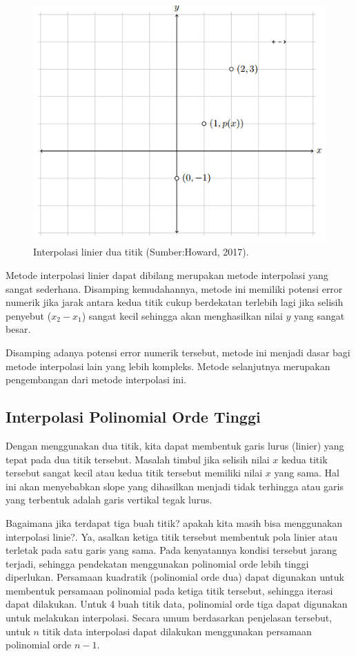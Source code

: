 \documentclass[
]{book}
\theoremstyle{definition}
\theoremstyle{definition}
\theoremstyle{definition}
\theoremstyle{definition}
\theoremstyle{remark}
\begin{document}
\begin{figure}

{\centering \includegraphics[width=0.8\linewidth]{./images/linviz} 

}

\caption{Interpolasi linier dua titik 
(Sumber:Howard, 2017).}\label{fig:linviz}
\end{figure}

Metode interpolasi linier dapat dibilang merupakan metode interpolasi yang sangat sederhana. Disamping kemudahannya, metode ini memiliki potensi error numerik jika jarak antara kedua titik cukup berdekatan terlebih lagi jika selisih penyebut (\(x_2-x_1\)) sangat kecil sehingga akan menghasilkan nilai \(y\) yang sangat besar.

Disamping adanya potensi error numerik tersebut, metode ini menjadi dasar bagi metode interpolasi lain yang lebih kompleks. Metode selanjutnya merupakan pengembangan dari metode interpolasi ini.

\hypertarget{hopoliinter}{%
\subsection{Interpolasi Polinomial Orde Tinggi}\label{hopoliinter}}

Dengan menggunakan dua titik, kita dapat membentuk garis lurus (linier) yang tepat pada dua titik tersebut. Masalah timbul jika selisih nilai \(x\) kedua titik tersebut sangat kecil atau kedua titik tersebut memiliki nilai \(x\) yang sama. Hal ini akan menyebabkan slope yang dihasilkan menjadi tidak terhingga atau garis yang terbentuk adalah garis vertikal tegak lurus.

Bagaimana jika terdapat tiga buah titik? apakah kita masih bisa menggunakan interpolasi linie?. Ya, asalkan ketiga titik tersebut membentuk pola linier atau terletak pada satu garis yang sama. Pada kenyatannya kondisi tersebut jarang terjadi, sehingga pendekatan menggunakan polinomial orde lebih tinggi diperlukan. Persamaan kuadratik (polinomial orde dua) dapat digunakan untuk membentuk persamaan polinomial pada ketiga titik tersebut, sehingga iterasi dapat dilakukan. Untuk 4 buah titik data, polinomial orde tiga dapat digunakan untuk melakukan interpolasi. Secara umum berdasarkan penjelasan tersebut, untuk \(n\) titik data interpolasi dapat dilakukan menggunakan persamaan polinomial orde \(n-1\).
\end{document}
